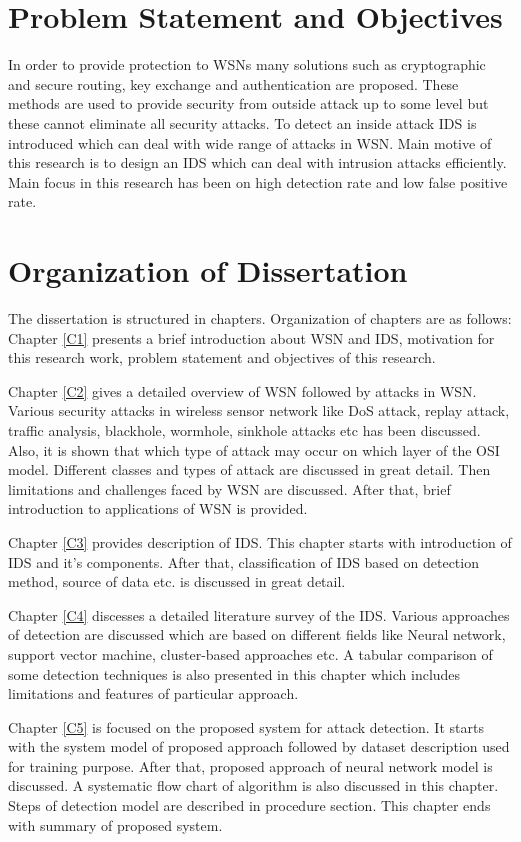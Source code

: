 \section{Problem Statement and Objectives}
In order to provide protection to WSNs many solutions such as cryptographic and secure routing, key exchange and authentication are proposed. These methods are used to provide security from outside attack up to some level but these cannot eliminate all security attacks. To detect an inside attack IDS is introduced which can deal with wide range of attacks in WSN. Main motive of this research is to design an IDS which can deal with intrusion attacks efficiently. Main focus in this research has been on high detection rate and low false positive rate.
\section{Organization of Dissertation}
The dissertation is structured in chapters. Organization of chapters are as follows:
\\
\noindent Chapter \ref{C1} presents a brief introduction about WSN and IDS, motivation for this research work, problem statement and objectives of this research.
\par Chapter \ref{C2} gives a detailed overview of WSN followed by attacks in WSN. Various security attacks in wireless sensor network like DoS attack, replay attack, traffic analysis, blackhole, wormhole, sinkhole attacks etc has been discussed. Also, it is shown that which type of attack may occur on which layer of the OSI model. Different classes and types of attack are discussed in great detail. Then limitations and challenges faced by WSN are discussed. After that, brief introduction to applications of WSN is provided. 
\par Chapter \ref{C3} provides description of IDS. This chapter starts with introduction of IDS and it's components. After that, classification  of IDS based on detection method, source of data etc. is discussed in great detail.
\par Chapter \ref{C4} discesses a detailed literature survey of the IDS.
Various approaches of detection are discussed which are based on different fields like Neural network, support vector machine, cluster-based approaches etc. A tabular comparison of some detection techniques is also presented in this chapter which includes limitations and features of particular approach.
\par Chapter \ref{C5} is focused on the proposed system for attack detection. It starts with the system model of proposed approach followed by dataset description used for training purpose. After that, proposed approach of neural network model is discussed. A systematic flow chart of algorithm is also discussed in this chapter. Steps of detection model are described in procedure section. This chapter ends with summary of proposed system.
